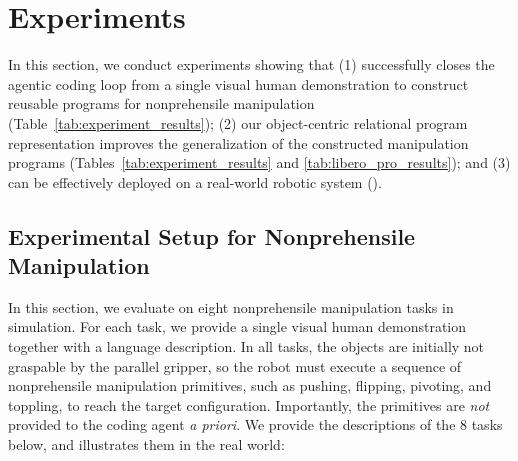 \section{Experiments}


In this section, we conduct experiments showing that (1) \ours successfully closes the agentic coding loop from a single visual human demonstration to construct reusable programs for nonprehensile manipulation (Table~\ref{tab:experiment_results}); (2) our object-centric relational program representation improves the generalization of the constructed manipulation programs (Tables~\ref{tab:experiment_results} and \ref{tab:libero_pro_results}); and (3) \ours can be effectively deployed on a real-world robotic system ().

\begin{table}[!t]
    \centering
    \caption{\textbf{Success rates on nonprehensile manipulation tasks in simulation.} We report mean$\pm$std across three trials; the best results are \textbf{bolded}.}
    \label{tab:experiment_results}
    
    \vspace{-0.2in}
\end{table}

\subsection{Experimental Setup for Nonprehensile Manipulation}
 In this section, we evaluate \ours on eight nonprehensile manipulation tasks in simulation. For each task, we provide a single visual human demonstration together with a language description. In all tasks, the objects are initially not graspable by the parallel gripper, so the robot must execute a sequence of nonprehensile manipulation primitives, such as pushing, flipping, pivoting, and toppling, to reach the target configuration. Importantly, the primitives are \textit{not} provided to the coding agent \textit{a priori}. We provide the descriptions of the 8 tasks below, and  illustrates them in the real world:

